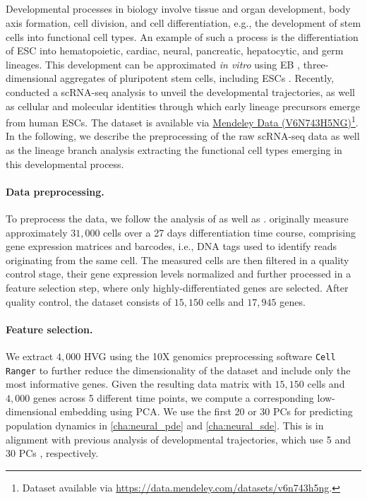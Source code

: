 \subsection{\citet{moon2019visualizing}}
\label{app:dataset_moon}

Developmental processes in biology involve tissue and organ development, body axis formation, cell division, and cell differentiation, e.g., the development of stem cells into functional cell types.
An example of such a process is the differentiation of \acrshort{ESC} into  hematopoietic, cardiac, neural, pancreatic, hepatocytic, and germ lineages.
This development can be approximated \textit{in vitro} using \acrfull{EB} \citep{martin1975differentiation}, three-dimensional aggregates of pluripotent stem cells, including ESCs \citep{shamblott2009derivation}.
Recently, \citet{moon2019visualizing} conducted a scRNA-seq analysis to unveil the developmental trajectories, as well as cellular and molecular identities through which early lineage precursors emerge from human ESCs.
The dataset is available via \href{https://data.mendeley.com/datasets/v6n743h5ng}{Mendeley Data (V6N743H5NG)}\footnote{Dataset available via \url{https://data.mendeley.com/datasets/v6n743h5ng}.}.
In the following, we describe the preprocessing of the raw scRNA-seq data as well as the lineage branch analysis extracting the functional cell types emerging in this developmental process.

\paragraph{Data preprocessing.}
To preprocess the data, we follow the analysis of \citet{moon2019visualizing} as well as \citet{luecken2019current}. \citet{moon2019visualizing} originally measure  approximately $31,000$ cells over a 27 days differentiation time course, comprising gene expression matrices and barcodes, i.e., DNA tags used to identify reads originating from the same cell. The measured cells are then filtered in a quality control stage, their gene expression levels normalized and further processed in a feature selection step, where only highly-differentiated genes are selected.
After quality control, the dataset consists of $15,150$ cells and $17,945$ genes.

\paragraph{Feature selection.}
We extract $4,000$ \acrshort{HVG} using the 10X genomics preprocessing software \texttt{Cell Ranger} \citep{zheng2017massively} to further reduce the dimensionality of the dataset and include only the most informative genes.
Given the resulting data matrix with $15,150$ cells and $4,000$ genes across 5 different time points, we compute a corresponding low-dimensional embedding using PCA. We use the first 20 or 30 PCs for predicting population dynamics in \cref{cha:neural_pde} and \ref{cha:neural_sde}.
This is in alignment with previous analysis of developmental trajectories, which use 5 \citep{tong2020trajectorynet} and 30 PCs \citep{schiebinger2019optimal}, respectively.

